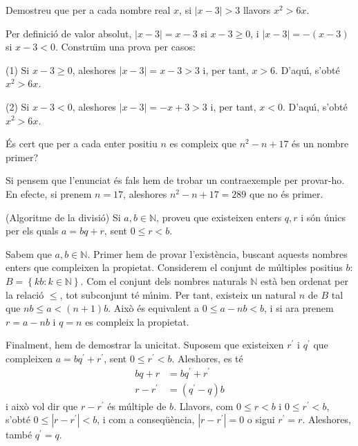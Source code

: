 \begin{exer}
Demostreu que per a cada nombre real $x$, si $\left\vert x-3\right\vert >3$
llavors $x^{2}>6x$.
\end{exer}

\begin{solucio}
Per definici\'{o} de valor absolut, $\left\vert x-3\right\vert =x-3$ si
$x-3\geq0$, i $\left\vert x-3\right\vert =-\left(  x-3\right)  $ si $x-3<0$.
Constru\"{\i}m una prova per casos:

(1) Si $x-3\geq0$, aleshores $\left\vert x-3\right\vert =x-3>3$ i, per tant,
$x>6$. D'aqu\'{\i}, s'obt\'{e} $x^{2}>6x$.

(2) Si $x-3<0$, aleshores $\left\vert x-3\right\vert =-x+3>3$ i, per tant,
$x<0$. D'aqu\'{\i}, s'obt\'{e} $x^{2}>6x$.
\end{solucio}

\begin{exer}
\'{E}s cert que per a cada enter positiu $n$ es compleix que $n^{2}-n+17$
\'{e}s un nombre primer?
\end{exer}

\begin{solucio}
Si pensem que l'enunciat \'{e}s fals hem de trobar un contraexemple per
provar-ho. En efecte, si prenem $n=17$, aleshores $n^{2}-n+17=289$ que no
\'{e}s primer.
\end{solucio}

\begin{exer}
(Algoritme de la divisi\'{o}) Si $a,b\in\mathbb{N}$, proveu que existeixen
enters $q,r$ i s\'{o}n \'{u}nics per els quals $a=bq+r$, sent $0\leq r<b$.
\end{exer}

\begin{solucio}
Sabem que $a,b\in\mathbb{N}$. Primer hem de provar l'exist\`{e}ncia, buscant
aquests nombres enters que compleixen la propietat. Considerem el conjunt de
m\'{u}ltiples positius $b$: $B=\left\{  kb:k\in\mathbb{N}\right\}  $. Com el
conjunt dels nombres naturals $\mathbb{N}$ est\`{a} ben ordenat per la
relaci\'{o} $\leq$, tot subconjunt t\'{e} m\'{\i}nim. Per tant, existeix un
natural $n$ de $B$ tal que $nb\leq a<(n+1)b$. Aix\`{o} \'{e}s equivalent a
$0\leq a-nb<b$, i si ara prenem $r=a-nb$ i $q=n$ es compleix la propietat.

Finalment, hem de demostrar la unicitat. Suposem que existeixen $r^{\prime}$ i
$q^{\prime}$ que compleixen $a=bq^{\prime}+r^{\prime}$, sent $0\leq r^{\prime
}<b$. Aleshores, es t\'{e}%
\begin{align*}
bq+r  &  =bq^{\prime}+r^{\prime}\\
r-r^{\prime}  &  =(q^{\prime}-q)b
\end{align*}
i aix\`{o} vol dir que $r-r^{\prime}$ \'{e}s m\'{u}ltiple de $b$. Llavors, com
$0\leq r<b$ i $0\leq r^{\prime}<b$, s'obt\'{e} $0\leq\left\vert r-r^{\prime
}\right\vert <b$, i com a conseq\"{u}\`{e}ncia, $\left\vert r-r^{\prime
}\right\vert =0$ o sigui $r^{\prime}=r$. Aleshores, tamb\'{e} $q^{\prime}=q$.
\end{solucio}

